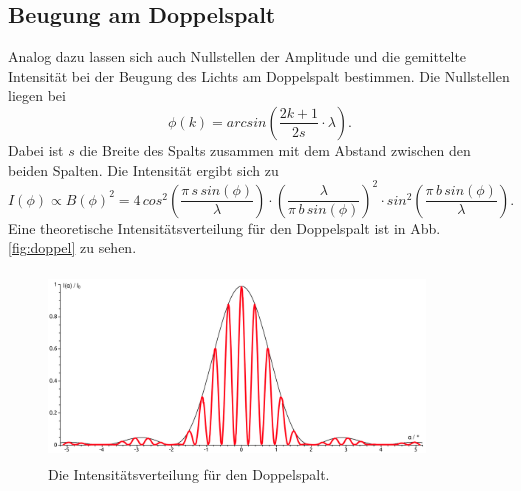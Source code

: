 \subsection{Beugung am Doppelspalt}
Analog dazu lassen sich auch Nullstellen der Amplitude und 
die gemittelte Intensität bei der Beugung des Lichts am 
Doppelspalt bestimmen.
Die Nullstellen liegen bei 
\begin{equation}
    \phi(k) = arcsin \left(\frac{2k+1}{2s}\cdot \lambda \right).
    \label{eqn:doppelns}
\end{equation}
Dabei ist $s$ die Breite des Spalts zusammen mit
dem Abstand zwischen den beiden Spalten.
\newline
Die Intensität ergibt sich zu 
\begin{equation}
    I(\phi) \propto B(\phi)^2 =4 \, cos^2 \left(\frac{\pi \, s \, sin(\phi)}{\lambda} \right)\cdot \left(\frac{\lambda}{\pi \, b \, sin(\phi)} \right)^2 \cdot sin^2 \left(\frac{\pi \, b \, sin(\phi)}{\lambda}\right).
    \label{eqn:doppelintensität}
\end{equation}
Eine theoretische Intensitätsverteilung für den Doppelspalt
ist in Abb. \ref{fig:doppel} zu sehen.
\begin{figure}
    \centering
    \includegraphics[width=10cm, height=5cm]{build/Doppelspalt.png}
    \caption{Die Intensitätsverteilung für den Doppelspalt. \cite{doppel}}
\end{figure}